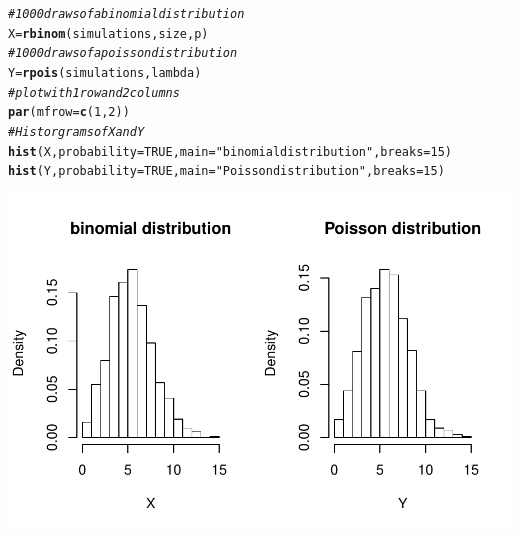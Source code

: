 \documentclass[12pt, a4paper]{article}\usepackage[]{graphicx}\usepackage[]{color}
\makeatletter
\def\maxwidth{ %
  \ifdim\Gin@nat@width>\linewidth
    \linewidth
  \else
    \Gin@nat@width
  \fi
}
\newcommand{\hlnum}[1]{\textcolor[rgb]{0.686,0.059,0.569}{#1}}%
\newcommand{\hlstr}[1]{\textcolor[rgb]{0.192,0.494,0.8}{#1}}%
\newcommand{\hlcom}[1]{\textcolor[rgb]{0.678,0.584,0.686}{\textit{#1}}}%
\newcommand{\hlstd}[1]{\textcolor[rgb]{0.345,0.345,0.345}{#1}}%
\newcommand{\hlkwb}[1]{\textcolor[rgb]{0.69,0.353,0.396}{#1}}%
\newcommand{\hlkwc}[1]{\textcolor[rgb]{0.333,0.667,0.333}{#1}}%
\newcommand{\hlkwd}[1]{\textcolor[rgb]{0.737,0.353,0.396}{\textbf{#1}}}%
\newenvironment{kframe}{%
 \def\at@end@of@kframe{}%
 \ifinner\ifhmode%
  \def\at@end@of@kframe{\end{minipage}}%
  \begin{minipage}{\columnwidth}%
 \fi\fi%
 \def\FrameCommand##1{\hskip\@totalleftmargin \hskip-\fboxsep
 \colorbox{shadecolor}{##1}\hskip-\fboxsep
     \hskip-\linewidth \hskip-\@totalleftmargin \hskip\columnwidth}%
 \MakeFramed {\advance\hsize-\width
   \@totalleftmargin\z@ \linewidth\hsize
   \@setminipage}}%
 {\par\unskip\endMakeFramed%
 \at@end@of@kframe}
\newenvironment{knitrout}{}{} %
\makeatother
\begin{document}
\begin{enumerate}
\begin{enumerate}
\begin{knitrout}
\begin{kframe}
\begin{alltt}
\hlcom{# 1000 draws of a binomial distribution}
\hlstd{X} \hlkwb{=} \hlkwd{rbinom}\hlstd{(simulations, size, p)}
\hlcom{# 1000 draws of a poisson distribution}
\hlstd{Y} \hlkwb{=} \hlkwd{rpois}\hlstd{(simulations, lambda)}
\hlcom{# plot with 1 row and 2 columns}
\hlkwd{par}\hlstd{(}\hlkwc{mfrow}\hlstd{=}\hlkwd{c}\hlstd{(}\hlnum{1}\hlstd{,}\hlnum{2}\hlstd{))}
\hlcom{# Historgrams of X and Y}
\hlkwd{hist}\hlstd{(X,} \hlkwc{probability} \hlstd{=} \hlnum{TRUE}\hlstd{,} \hlkwc{main} \hlstd{=} \hlstr{"binomial distribution"}\hlstd{,} \hlkwc{breaks} \hlstd{=} \hlnum{15}\hlstd{)}
\hlkwd{hist}\hlstd{(Y,} \hlkwc{probability} \hlstd{=} \hlnum{TRUE}\hlstd{,} \hlkwc{main} \hlstd{=} \hlstr{"Poisson distribution"}\hlstd{,} \hlkwc{breaks} \hlstd{=} \hlnum{15}\hlstd{)}
\end{alltt}
\end{kframe}

{\centering \includegraphics[width=\maxwidth]{figure/unnamed-chunk-5-1} 

}



\end{knitrout}
\end{enumerate}
\end{enumerate}
\end{document}
